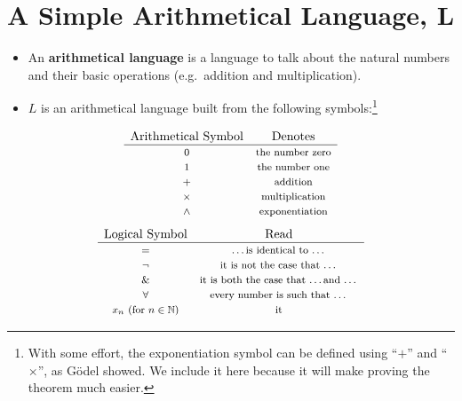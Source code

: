 \documentclass[12pt]{extarticle}
\begin{document}
\section{A Simple Arithmetical Language, $\bm{L}$}

\begin{itemize}
\item An \textbf{arithmetical language} is a language to talk about the natural numbers and their basic operations (e.g.~addition and multiplication).



\item $L$ is an arithmetical language built from the following symbols:\footnote{With some effort, the exponentiation symbol can be defined using ``$+$'' and ``$\times$'', as G\"odel showed. We include it here because it will make proving the theorem much easier.}
\end{itemize}

\[
\begin{array}{cc}\label{gloss:exponentiation}
 \text{{Arithmetical Symbol}} &\text{{Denotes}}   \\
\hline
 \text{\footnotesize 0}   & \text{\footnotesize  the number zero}  \\
  \text{\footnotesize 1}  & \text{\footnotesize  the number one}  \\
    \text{\footnotesize $+$}  & \text{\footnotesize  addition}  \\
        \text{\footnotesize $\times$}  & \text{\footnotesize  multiplication}  \\
            \text{\footnotesize $\wedge$}  & \text{\footnotesize  exponentiation} 
\end{array}
\]
\vspace{2mm}
\[
\begin{array}{cc}\label{gloss:logica-symb}
 \text{{Logical Symbol}}  &\text{{Read}}   \\
\hline
  \text{\footnotesize $=$}  & \text{\footnotesize  \dots is identical to \dots}  \\
 \text{\footnotesize $\neg$} & \text{\footnotesize  it is not the case that \dots}  \\
\text{\footnotesize $\&$}  & \text{\footnotesize  it is both the case that \dots and \dots}  \\
\text{\footnotesize $\forall$} & \text{\footnotesize  every number is such that \dots} \\
\text{\footnotesize $x_n$ (for $n \in \mathbb{N}$)} & \text{\footnotesize it} 
\end{array}
\]
\vspace{2mm}
\end{document}
